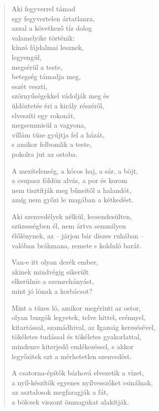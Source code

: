 \begin{verse}
 Aki fegyverrel támad\\
egy fegyvertelen ártatlanra,\\
azzal a következő tíz dolog\\
valamelyike történik:\\
kínzó fájdalmai lesznek,\\
legyengül,\\
megsérül a teste,\\
betegség támadja meg,\\
eszét veszti,\\
szörnyűségekkel vádolják meg és\\
üldöztetés éri a király részéről,\\
elveszíti egy rokonát,\\
megsemmisül a vagyona,\\
villám tüze gyújtja fel a házát,\\
s amikor felbomlik a teste,\\
pokolra jut az ostoba.

 A mezítelenség, a kócos haj, a sár, a böjt,\\
a csupasz földön alvás, a por és korom\\
nem tisztítják meg bűneitől a halandót,\\
amíg nem győzi le magában a kétkedést.

 Aki szenvedélyek nélkül, lecsendesülten,\\
szüzességben él, nem ártva semmilyen\\
élőlénynek, az – járjon bár díszes ruhában –\\
valóban bráhmana, remete s kolduló barát.

 Van-e itt olyan derék ember,\\
akinek mindvégig sikerült\\
elkerülnie a szemrehányást,\\
mint jó lónak a korbácsot?

 Mint a tüzes ló, amikor megérinti az ostor,\\
olyan buzgók legyetek, telve hittel, erénnyel,\\
kitartással, szamádhival, az Igazság keresésével,\\
tökéletes tudással és tökéletes gyakorlattal,\\
mindenre kiterjedő emlékezéssel, s akkor\\
legyőzitek ezt a mérhetetlen szenvedést.

\newpage

 A csatorna-építők bárhová elvezetik a vizet,\\
a nyíl-készítők egyenes nyílvesszőket csinálnak,\\
az asztalosok megfaragják a fát,\\
a bölcsek viszont önmagukat alakítják.

\end{verse}

